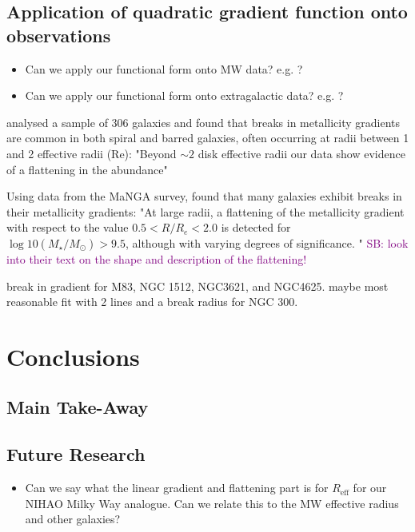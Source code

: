 \documentclass[fleqn,usenatbib]{mnras}
\newcommand{\SB}[1]{{\textcolor{purple}{SB: #1}}}
\begin{document}
\subsection{Application of quadratic gradient function onto observations}

\begin{itemize}
    \item Can we apply our functional form onto MW data? e.g. \citet{Yong2012, Andrievsky2004, Genovali2014}?
    \item Can we apply our functional form onto extragalactic data? e.g. \citet{Chen2023, Bresolin2012}?
\end{itemize}

\citet{Sanchez2014} analysed a sample of 306 galaxies and found that breaks in metallicity gradients are common in both spiral and barred galaxies, often occurring at radii between 1 and 2 effective radii (Re): "Beyond $\sim 2$ disk effective radii our data show evidence of a flattening in the abundance"

Using data from the MaNGA survey, \citet{Belfiore2017} found that many galaxies exhibit breaks in their metallicity gradients: "At large radii, a flattening of the metallicity gradient with respect to the value $0.5 < R/R_e < 2.0$ is detected for $\log10(M_\star/M_\odot) > 9.5$, although with varying degrees of significance. " \SB{look into their text on the shape and description of the flattening!}

\citet{Bresolin2012} break in gradient for M83, NGC 1512, NGC3621, and NGC4625.
\citet{Vlajic2009} maybe most reasonable fit with 2 lines and a break radius for NGC 300.

\section{Conclusions}
\label{sec:conc}

\subsection{Main Take-Away}

\subsection{Future Research}

\begin{itemize}
    \item Can we say what the linear gradient and flattening part is for $R_\text{eff}$ for our NIHAO Milky Way analogue. Can we relate this to the MW effective radius and other galaxies?
\end{itemize}
\end{document}
